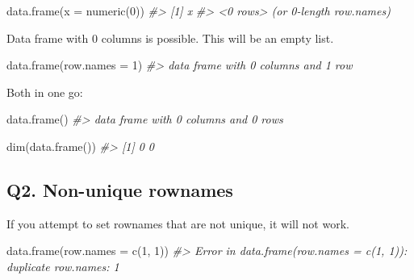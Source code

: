 \documentclass[
]{book}
\newenvironment{Shaded}{\begin{snugshade}}{\end{snugshade}}
\newcommand{\AttributeTok}[1]{\textcolor[rgb]{0.77,0.63,0.00}{#1}}
\newcommand{\CommentTok}[1]{\textcolor[rgb]{0.56,0.35,0.01}{\textit{#1}}}
\newcommand{\DecValTok}[1]{\textcolor[rgb]{0.00,0.00,0.81}{#1}}
\newcommand{\FunctionTok}[1]{\textcolor[rgb]{0.00,0.00,0.00}{#1}}
\newcommand{\NormalTok}[1]{#1}
\begin{document}
\begin{Shaded}
\begin{Highlighting}[]
\FunctionTok{data.frame}\NormalTok{(}\AttributeTok{x =} \FunctionTok{numeric}\NormalTok{(}\DecValTok{0}\NormalTok{))}
\CommentTok{\#\textgreater{} [1] x}
\CommentTok{\#\textgreater{} \textless{}0 rows\textgreater{} (or 0{-}length row.names)}
\end{Highlighting}
\end{Shaded}

Data frame with 0 columns is possible. This will be an empty list.

\begin{Shaded}
\begin{Highlighting}[]
\FunctionTok{data.frame}\NormalTok{(}\AttributeTok{row.names =} \DecValTok{1}\NormalTok{)}
\CommentTok{\#\textgreater{} data frame with 0 columns and 1 row}
\end{Highlighting}
\end{Shaded}

Both in one go:

\begin{Shaded}
\begin{Highlighting}[]
\FunctionTok{data.frame}\NormalTok{()}
\CommentTok{\#\textgreater{} data frame with 0 columns and 0 rows}

\FunctionTok{dim}\NormalTok{(}\FunctionTok{data.frame}\NormalTok{())}
\CommentTok{\#\textgreater{} [1] 0 0}
\end{Highlighting}
\end{Shaded}

\hypertarget{q2.-non-unique-rownames}{%
\subsection*{Q2. Non-unique rownames}\label{q2.-non-unique-rownames}}

If you attempt to set rownames that are not unique, it will not work.

\begin{Shaded}
\begin{Highlighting}[]
\FunctionTok{data.frame}\NormalTok{(}\AttributeTok{row.names =} \FunctionTok{c}\NormalTok{(}\DecValTok{1}\NormalTok{, }\DecValTok{1}\NormalTok{))}
\CommentTok{\#\textgreater{} Error in data.frame(row.names = c(1, 1)): duplicate row.names: 1}
\end{Highlighting}
\end{Shaded}
\end{document}
